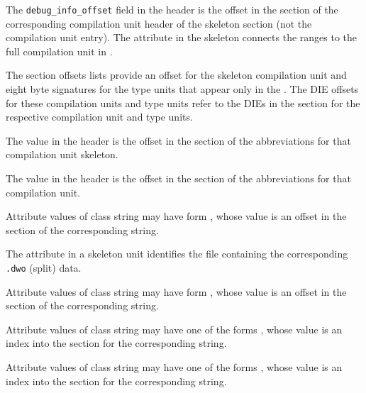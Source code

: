 \begin{description}

The \texttt{debug\_info\_offset} field in the header is the 
offset in the \dotdebuginfo{} section of the corresponding 
compilation unit header of the skeleton \dotdebuginfo{} section 
(not the compilation unit entry).  The \DWATdwoname{} attribute 
in the \dotdebuginfo{} skeleton connects 
the ranges to the full compilation unit in \dotdebuginfodwo.

The \dotdebugnames{} section  offsets lists provide an offset
for the skeleton compilation unit and eight 
byte signatures for the type units that appear only in the 
\dotdebuginfodwo. The DIE offsets for these 
compilation units and type units refer to the DIEs in the 
\dotdebuginfodwo{} section for the respective 
compilation unit and type units.

The \HFNdebugabbrevoffset{} value in the header is 
the offset in the \dotdebugabbrev{} section of the 
abbreviations for that compilation unit skeleton.

The \HFNdebugabbrevoffset{} value in the header 
is the offset in the \dotdebugabbrevdwo{} section of the 
abbreviations for that compilation unit.

Attribute values of class string may have form \DWFORMstrp, 
whose value is an offset in the 
\dotdebugstr{} section of the corresponding string.

The \DWATdwoname{}
attribute in a skeleton unit identifies the file containing 
the corresponding \texttt{.dwo} (split) data. 

Attribute values of class string may have form 
\DWFORMstrp, whose value is an offset in the 
\dotdebugstrdwo{} section of the corresponding string.

Attribute values of class string may have one of the forms
\DWFORMstrxXNor, whose value is an index into the 
\dotdebugstroffsets{} section for the corresponding string.

Attribute values of class string may have one of the forms
\DWFORMstrxXNor, whose value is an index into the 
\dotdebugstroffsetsdwo{} section for the corresponding string.


\end{description}
